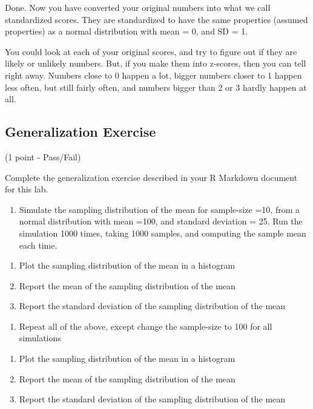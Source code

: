 \documentclass[]{book}
\providecommand{\tightlist}{%
  \setlength{\itemsep}{0pt}\setlength{\parskip}{0pt}}
\begin{document}
Done. Now you have converted your original numbers into what we call
standardized scores. They are standardized to have the same properties
(assumed properties) as a normal distribution with mean = 0, and SD = 1.

You could look at each of your original scores, and try to figure out if
they are likely or unlikely numbers. But, if you make them into
z-scores, then you can tell right away. Numbers close to 0 happen a lot,
bigger numbers closer to 1 happen less often, but still fairly often,
and numbers bigger than 2 or 3 hardly happen at all.

\subsection{Generalization Exercise}\label{generalization-exercise-3}

(1 point - Pass/Fail)

Complete the generalization exercise described in your R Markdown
document for this lab.

\begin{enumerate}
\def\labelenumi{\arabic{enumi}.}
\tightlist
\item
  Simulate the sampling distribution of the mean for sample-size =10,
  from a normal distribution with mean =100, and standard deviation =
  25. Run the simulation 1000 times, taking 1000 samples, and computing
  the sample mean each time.
\end{enumerate}

\begin{enumerate}
\def\labelenumi{\alph{enumi}.}
\tightlist
\item
  Plot the sampling distribution of the mean in a histogram
\item
  Report the mean of the sampling distribution of the mean
\item
  Report the standard deviation of the sampling distribution of the mean
\end{enumerate}

\begin{enumerate}
\def\labelenumi{\arabic{enumi}.}
\setcounter{enumi}{1}
\tightlist
\item
  Repeat all of the above, except change the sample-size to 100 for all
  simulations
\end{enumerate}

\begin{enumerate}
\def\labelenumi{\alph{enumi}.}
\tightlist
\item
  Plot the sampling distribution of the mean in a histogram
\item
  Report the mean of the sampling distribution of the mean
\item
  Report the standard deviation of the sampling distribution of the mean
\end{enumerate}
\end{document}
